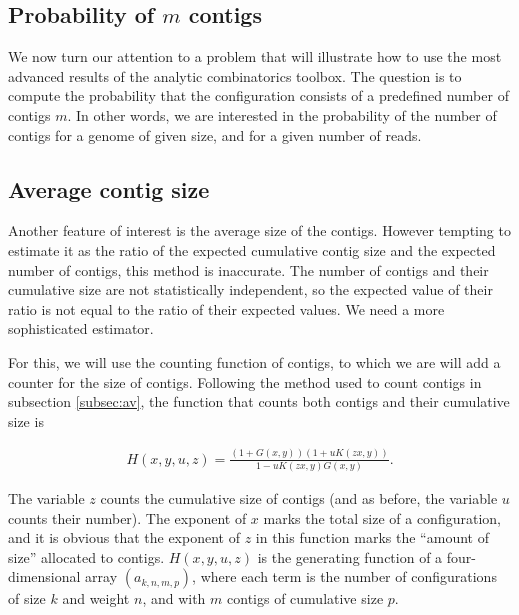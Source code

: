 \documentclass{article}
\begin{document}
\subsection{Probability of $m$ contigs}
\label{subsec:probmcontigs}

We now turn our attention to a problem that will illustrate how to use the
most advanced results of the analytic combinatorics toolbox. The question
is to compute the probability that the configuration consists of a
predefined number of contigs $m$. In other words, we are interested in the
probability of the number of contigs for a genome of given size, and for a
given number of reads.






\subsection{Average contig size}
\label{subsec:avctsz}

Another feature of interest is the average size of the contigs. However
tempting to estimate it as the ratio of the expected cumulative contig
size and the expected number of contigs, this method is inaccurate. The
number of contigs and their cumulative size are not statistically
independent, so the expected value of their ratio is not equal to the
ratio of their expected values. We need a more sophisticated estimator.

For this, we will use the counting function of contigs, to which we are
will add a counter for the size of contigs. Following the method used to
count contigs in subsection \ref{subsec:av}, the function that counts
both contigs and their cumulative size is

\begin{equation*}
\begin{split}
H(x,y,u,z) = \frac{(1+G(x,y))(1+uK(zx,y))}{1-uK(zx,y)G(x,y)}.
\end{split}
\end{equation*}

The variable $z$ counts the cumulative size of contigs (and as before, the
variable $u$ counts their number). The exponent of $x$ marks the total
size of a configuration, and it is obvious that the exponent of $z$ in
this function marks the ``amount of size'' allocated to contigs.
$H(x,y,u,z)$ is the generating function of a four-dimensional array
$(a_{k,n,m,p})$, where each term is the number of configurations of size
$k$ and weight $n$, and with $m$ contigs of cumulative size $p$.
\end{document}
